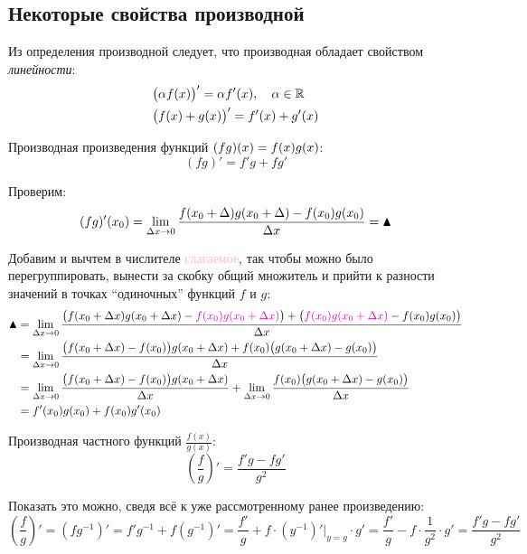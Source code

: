 \documentclass[a4paper,12pt]{article}
\begin{document}
  
  \subsection{Некоторые свойства производной}
  
  Из определения производной следует, что производная обладает свойством \emph{линейности}:
  \[
    \begin{aligned}
      &\bigl(\alpha f(x)\bigr)' = \alpha f'(x),\quad \alpha \in \operatorname{\mathbb R}\\
      &\bigl(f(x) + g(x)\bigr)' = f'(x) + g'(x)
    \end{aligned}
  \]
  
  Производная произведения функций $(fg)(x) \hm= f(x) g(x)$:
  \begin{equation}
    \boxed{(fg)' = f' g + f g'}
  \end{equation}
  
  Проверим:
  \[
    (fg)'(x_0) = \lim_{\Delta x \to 0} \frac{f(x_0 + \Delta) g(x_0 + \Delta) - f(x_0) g(x_0)}{\Delta x} = \blacktriangle
  \]
  
  Добавим и вычтем в числителе \textcolor{pink}{слагаемое}, так чтобы можно было перегруппировать, вынести за скобку общий множитель и прийти к разности значений в точках ``одиночных'' функций $f$ и $g$:
  \begin{equation}\label{eq:d-prod}
  \begin{split}
    \blacktriangle &= \lim_{\Dt x \to 0} \frac{\bigl(f(x_0 + \Dt x) g(x_0 + \Dt x) - \textcolor{pink}{f(x_0) g(x_0 + \Dt x)}\bigr) + \bigl(\textcolor{pink}{f(x_0) g(x_0 + \Dt x)} - f(x_0) g(x_0)\bigr)}{\Dt x}\\
      &= \lim_{\Dt x \to 0} \frac{\bigl(f(x_0 + \Dt x) - f(x_0)\bigr) g(x_0 + \Dt x) + f(x_0) \bigl(g(x_0 + \Dt x) - g(x_0)\bigr)}{\Dt x}\\
      &= \lim_{\Dt x \to 0} \frac{\bigl(f(x_0 + \Dt x) - f(x_0)\bigr) g(x_0 + \Dt x)}{\Dt x} + \lim_{\Dt x \to 0} \frac{f(x_0) \bigl(g(x_0 + \Dt x) - g(x_0)\bigr)}{\Dt x}\\
      &= f'(x_0) g(x_0) + f(x_0) g'(x_0)
  \end{split}
  \end{equation}
  
  Производная частного функций $\frac{f(x)}{g(x)}$:
  \begin{equation}
    \boxed{\left(\frac{f}{g}\right)' = \frac{f'g - fg'}{g^2}}
  \end{equation}
  
  Показать это можно, сведя всё к уже рассмотренному ранее произведению:
  \[
    \left(\frac{f}{g}\right)' = \left(fg^{-1}\right)'
      = f'g^{-1} + f \left(g^{-1}\right)'
      = \frac{f'}{g} + f \cdot \left(y^{-1}\right)'|_{y = g} \cdot g'
      = \frac{f'}{g} - f \cdot \frac{1}{g^2} \cdot g'
      = \frac{f'g - fg'}{g^2}
  \]
  
\end{document}
